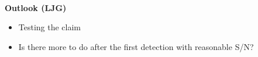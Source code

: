 \textbf{}\\

\textbf{Outlook (LJG)}

\begin{itemize}
\item
  Testing the claim
\item
  Is there more to do after the first detection with reasonable S/N?
\end{itemize}






